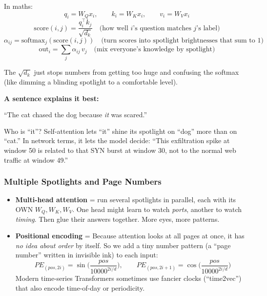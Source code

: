 \documentclass[11pt,a4paper]{article}
\begin{document}
In maths:
\[
q_i = W_Q x_i,\qquad k_i = W_K x_i,\qquad v_i = W_V x_i
\]
\[
\text{score}(i,j) = \frac{q_i^\top k_j}{\sqrt{d_k}}\quad\text{(how well $i$'s question matches $j$'s label)}
\]
\[
\alpha_{ij} = \text{softmax}_j(\text{score}(i,j))\quad\text{(turn scores into spotlight brightnesses that sum to 1)}
\]
\[
\text{out}_i = \sum_j \alpha_{ij}\, v_j\quad\text{(mix everyone's knowledge by spotlight)}
\]

The $\sqrt{d_k}$ just stops numbers from getting too huge and confusing the
softmax (like dimming a blinding spotlight to a comfortable level).

\begin{examplebox}
\textbf{A sentence explains it best:}

``The cat chased the dog because \emph{it} was scared.''

Who is ``it''? Self-attention lets ``it'' shine its spotlight on ``dog'' more
than on ``cat.'' In network terms, it lets the model decide: ``This
exfiltration spike at window 50 is related to that SYN burst at window 30,
not to the normal web traffic at window 49.''
\end{examplebox}

\subsubsection{Multiple Spotlights and Page Numbers}

\begin{itemize}[leftmargin=1.6em,itemsep=2pt]
  \item \textbf{Multi-head attention} = run several spotlights in parallel,
        each with its OWN $W_Q, W_K, W_V$. One head might learn to watch
        \emph{ports}, another to watch \emph{timing}. Then glue their answers
        together. More eyes, more patterns.

  \item \textbf{Positional encoding} = Because attention looks at all pages at
        once, it has \emph{no idea about order} by itself. So we add a tiny
        number pattern (a ``page number'' written in invisible ink) to each
        input:
        \[
        PE_{(pos, 2i)} = \sin\!\Big(\frac{pos}{10000^{2i/d}}\Big),\qquad
        PE_{(pos, 2i+1)} = \cos\!\Big(\frac{pos}{10000^{2i/d}}\Big)
        \]
        Modern time-series Transformers sometimes use fancier clocks
        (``time2vec'') that also encode time-of-day or periodicity.
\end{itemize}
\end{document}
